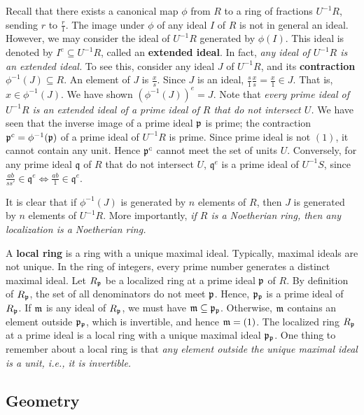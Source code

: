 Recall that there exists a canonical map $\phi$ from $R$ to a ring of fractions $U^{-1}R$, sending $r$ to $\frac{r}{1}$.
The image under $\phi$ of any ideal $I$ of $R$ is not in general an ideal.
However, we may consider the ideal of $U^{-1}R$ generated by $\phi(I)$.
This ideal is denoted by $I^e \subseteq U^{-1}R$, called an {\bf extended ideal}.
In fact, {\em any ideal of $U^{-1}R$ is an extended ideal.}
To see this, consider any ideal $J$ of $U^{-1}R$, and its {\bf contraction} $\phi^{-1}(J) \subseteq R$.
An element of $J$ is $\frac{x}{s}$. Since $J$ is an ideal, $\frac{s}{1} \frac{x}{s} = \frac{x}{1} \in J$.
That is, $x \in \phi^{-1}(J)$. We have shown $(\phi^{-1}(J))^e = J$.
Note that {\em every prime ideal of $U^{-1}R$ is an extended ideal of a prime ideal of $R$ 
that do not intersect $U$.}
We have seen that the inverse image of a prime ideal $\mathfrak{p}$ is prime;
the contraction $\mathfrak{p}^c = \phi^{-1}(\mathfrak{p})$ of a prime ideal of $U^{-1}R$ is prime.
Since prime ideal is not $(1)$, it cannot contain any unit.
Hence $\mathfrak{p}^c$ cannot meet the set of units $U$.
Conversely, for any prime ideal $\mathfrak q$ of $R$ that do not intersect $U$,
$\mathfrak q^e$ is a prime ideal of $U^{-1}S$,
since $\frac{ab}{ss'} \in \mathfrak q^e \Longleftrightarrow \frac{ab}{1} \in \mathfrak q^e$.

It is clear that if $\phi^{-1}(J)$ is generated by $n$ elements of $R$,
then $J$ is generated by $n$ elements of $U^{-1}R$.
More importantly, {\em if $R$ is a Noetherian ring, then any localization is a Noetherian ring.}


A {\bf local ring} is a ring with a unique maximal ideal.
Typically, maximal ideals are not unique.
In the ring of integers, every prime number generates a distinct maximal ideal.
Let $R_{\mathfrak{p}}$ be a localized ring at a prime ideal $\mathfrak{p}$ of $R$.
By definition of $R_{\mathfrak{p}}$, the set of all denominators do not meet $\mathfrak{p}$.
Hence, $\mathfrak{p}_{\mathfrak{p}}$ is a prime ideal of $R_{\mathfrak{p}}$.
If $\mathfrak{m}$ is any ideal of $R_{\mathfrak{p}}$, we must have $\mathfrak{m} \subseteq \mathfrak{p}_{\mathfrak{p}}$.
Otherwise, $\mathfrak{m}$ contains an element outside $\mathfrak{p}_{\mathfrak{p}}$, which is invertible,
and hence $\mathfrak{m} = (1)$.
The localized ring $R_{\mathfrak{p}}$ at a prime ideal is a local ring with a unique maximal ideal $\mathfrak{p}_{\mathfrak{p}}$.
One thing to remember about a local ring is that
{\em any element outside the unique maximal ideal is a unit, i.e., it is invertible.}



\subsection*{Geometry}

